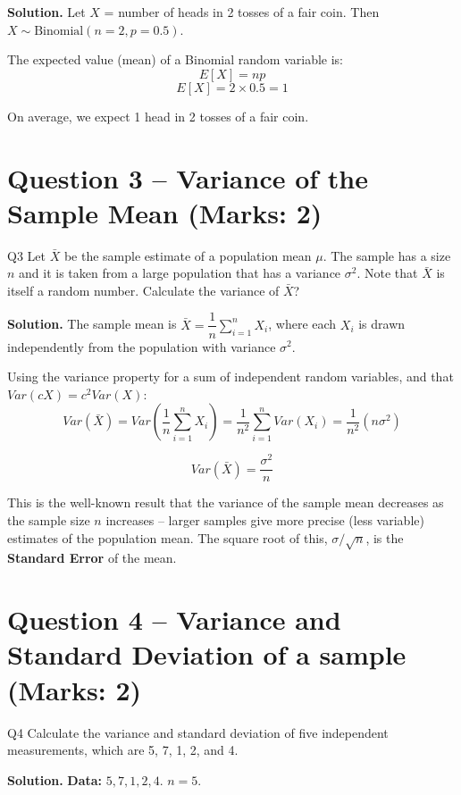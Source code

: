 \documentclass[11pt]{article}
\newcommand{\soln}{\par\noindent\textcolor{acolor}{\textbf{Solution.}}\quad}
\begin{document}
\soln
Let $X$ = number of heads in 2 tosses of a fair coin. Then $X \sim \text{Binomial}(n=2, p=0.5)$.

The expected value (mean) of a Binomial random variable is:
\[
E[X] = np
\]
\[
\boxed{E[X] = 2 \times 0.5 = 1}
\]

On average, we expect 1 head in 2 tosses of a fair coin.

\section{Question 3 -- Variance of the Sample Mean (Marks: 2)}
\begin{question}{Q3}
Let $\bar{X}$ be the sample estimate of a population mean $\mu$. The sample has a size $n$ and it is taken from a large population that has a variance $\sigma^2$. Note that $\bar{X}$ is itself a random number. Calculate the variance of $\bar{X}$?
\end{question}

\soln
The sample mean is $\bar{X} = \dfrac{1}{n}\sum_{i=1}^n X_i$, where each $X_i$ is drawn independently from the population with variance $\sigma^2$.

Using the variance property for a sum of independent random variables, and that $Var(cX) = c^2 Var(X)$:
\[
Var(\bar{X}) = Var\left(\frac{1}{n}\sum_{i=1}^n X_i\right) = \frac{1}{n^2}\sum_{i=1}^n Var(X_i) = \frac{1}{n^2}(n\sigma^2)
\]

\[
\boxed{Var(\bar{X}) = \frac{\sigma^2}{n}}
\]

This is the well-known result that the variance of the sample mean decreases as the sample size $n$ increases -- larger samples give more precise (less variable) estimates of the population mean. The square root of this, $\sigma/\sqrt{n}$, is the \textbf{Standard Error} of the mean.

\section{Question 4 -- Variance and Standard Deviation of a sample (Marks: 2)}
\begin{question}{Q4}
Calculate the variance and standard deviation of five independent measurements, which are 5, 7, 1, 2, and 4.
\end{question}

\soln
\textbf{Data:} $5, 7, 1, 2, 4$. \quad $n=5$.
\end{document}
